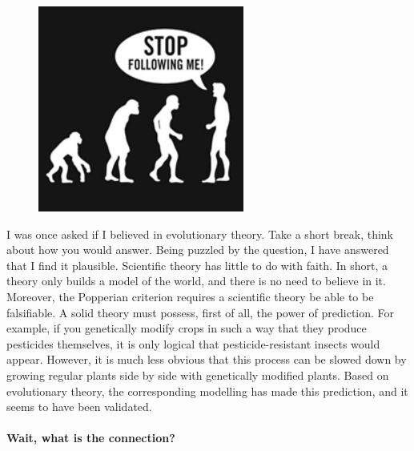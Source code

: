 \documentclass[notitlepage]{report}
\begin{document}
\begin{figure}
\includegraphics[width=\linewidth]{stop-following-me.png}
\end{figure}
I was once asked if I believed in evolutionary theory. 
Take a short break, think about how you would answer.
Being puzzled by the question, I have answered that I find it plausible. 
Scientific theory has little to do with faith.
In short, a theory only builds a model of the world, and there is no need to believe in it.
Moreover, the Popperian criterion\cite{} requires a scientific theory be able to be falsifiable. 
A solid theory must possess, first of all, the power of prediction.
For example, if you genetically modify crops in such a way that they produce pesticides themselves, 
it is only logical that pesticide-resistant insects would appear. 
However, it is much less obvious that this process can be slowed down by growing regular plants side by side with genetically modified plants. 
Based on evolutionary theory, the corresponding modelling has made this prediction\cite{}, and it seems to have been validated\cite{}.

\paragraph*{Wait, what is the connection?}
\end{document}
